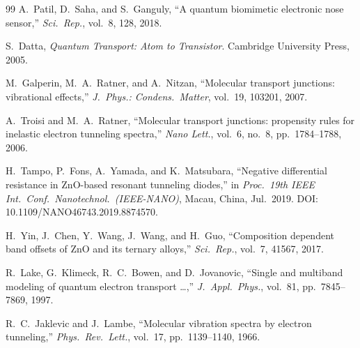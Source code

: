 \documentclass[conference]{IEEEtran}
\begin{document}
\begin{thebibliography}{99}
 A.~Patil, D.~Saha, and S.~Ganguly, ``A quantum
biomimetic electronic nose sensor,'' \textit{Sci.\ Rep.}, vol.~8, 128,
2018.

 S.~Datta, \textit{Quantum Transport: Atom to Transistor}.
Cambridge University Press, 2005.

 M.~Galperin, M.~A.~Ratner, and A.~Nitzan,
``Molecular transport junctions: vibrational effects,''
\textit{J.\ Phys.: Condens.\ Matter}, vol.~19, 103201, 2007.

 A.~Troisi and M.~A.~Ratner, ``Molecular transport
junctions: propensity rules for inelastic electron tunneling spectra,''
\textit{Nano Lett.}, vol.~6, no.~8, pp.~1784--1788, 2006.

 H.~Tampo, P.~Fons, A.~Yamada, and K.~Matsubara,
``Negative differential resistance in ZnO-based resonant tunneling
diodes,'' in \textit{Proc.\ 19th IEEE Int.\ Conf.\ Nanotechnol.\
(IEEE-NANO)}, Macau, China, Jul.\ 2019.
DOI: 10.1109/NANO46743.2019.8874570.

 H.~Yin, J.~Chen, Y.~Wang, J.~Wang, and H.~Guo,
``Composition dependent band offsets of ZnO and its ternary alloys,''
\textit{Sci.\ Rep.}, vol.~7, 41567, 2017.

 R.~Lake, G.~Klimeck, R.~C.~Bowen, and D.~Jovanovic,
``Single and multiband modeling of quantum electron transport \ldots,''
\textit{J.\ Appl.\ Phys.}, vol.~81, pp.~7845--7869, 1997.

 R.~C.~Jaklevic and J.~Lambe, ``Molecular vibration
spectra by electron tunneling,'' \textit{Phys.\ Rev.\ Lett.}, vol.~17,
pp.~1139--1140, 1966.

\end{thebibliography}
\end{document}
